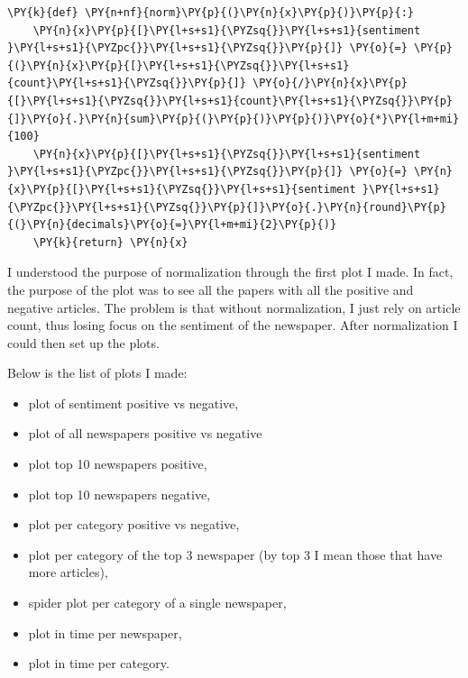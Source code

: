     \begin{tcolorbox}[breakable, size=fbox, boxrule=1pt, pad at break*=1mm,colback=cellbackground, colframe=cellborder]
\begin{Verbatim}[commandchars=\\\{\},fontsize=\footnotesize]
\PY{k}{def} \PY{n+nf}{norm}\PY{p}{(}\PY{n}{x}\PY{p}{)}\PY{p}{:}
    \PY{n}{x}\PY{p}{[}\PY{l+s+s1}{\PYZsq{}}\PY{l+s+s1}{sentiment }\PY{l+s+s1}{\PYZpc{}}\PY{l+s+s1}{\PYZsq{}}\PY{p}{]} \PY{o}{=} \PY{p}{(}\PY{n}{x}\PY{p}{[}\PY{l+s+s1}{\PYZsq{}}\PY{l+s+s1}{count}\PY{l+s+s1}{\PYZsq{}}\PY{p}{]} \PY{o}{/}\PY{n}{x}\PY{p}{[}\PY{l+s+s1}{\PYZsq{}}\PY{l+s+s1}{count}\PY{l+s+s1}{\PYZsq{}}\PY{p}{]}\PY{o}{.}\PY{n}{sum}\PY{p}{(}\PY{p}{)}\PY{p}{)}\PY{o}{*}\PY{l+m+mi}{100}   
    \PY{n}{x}\PY{p}{[}\PY{l+s+s1}{\PYZsq{}}\PY{l+s+s1}{sentiment }\PY{l+s+s1}{\PYZpc{}}\PY{l+s+s1}{\PYZsq{}}\PY{p}{]} \PY{o}{=} \PY{n}{x}\PY{p}{[}\PY{l+s+s1}{\PYZsq{}}\PY{l+s+s1}{sentiment }\PY{l+s+s1}{\PYZpc{}}\PY{l+s+s1}{\PYZsq{}}\PY{p}{]}\PY{o}{.}\PY{n}{round}\PY{p}{(}\PY{n}{decimals}\PY{o}{=}\PY{l+m+mi}{2}\PY{p}{)}
    \PY{k}{return} \PY{n}{x}  
\end{Verbatim}
\end{tcolorbox}

I understood the purpose of normalization through the first \gls{plot} I made. In fact, the purpose of the \gls{plot} was to see all the papers with all the positive and negative articles. The problem is that without normalization, I just rely on article count, thus losing focus on the sentiment of the newspaper.
After normalization I could then set up the plots.

Below is the list of plots I made:
\begin{itemize}
    \item \gls{plot} of sentiment positive vs negative,
    \item \gls{plot} of all newspapers positive vs negative
    \item \gls{plot} top 10 newspapers positive,
    \item \gls{plot} top 10 newspapers negative,
    \item \gls{plot} per category positive vs negative,
    \item \gls{plot} per category of the top 3 newspaper (by top 3 I mean those that have more articles),
    \item spider \gls{plot} per category of a single newspaper, 
    \item \gls{plot} in time per newspaper,
    \item \gls{plot} in time per category.
\end{itemize}


